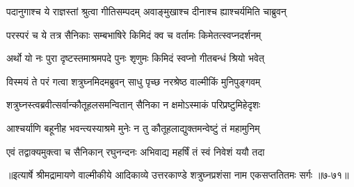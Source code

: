 \twolineshloka
{पदानुगाश्च ये राज्ञस्तां श्रुत्वा गीतिसम्पदम्}
{अवाङ्मुखाश्च दीनाश्च ह्याश्चर्यमिति चाब्रुवन्} %

\twolineshloka
{परस्परं च ये तत्र सैनिकाः सम्बभाषिरे}
{किमिदं क्व च वर्तामः किमेतत्स्वप्नदर्शनम्} %

\twolineshloka
{अर्थो यो नः पुरा दृष्टस्तमाश्रमपदे पुनः}
{शृणुमः किमिदं स्वप्नो गीतबन्धं श्रियो भवेत्} %

\twolineshloka
{विस्मयं ते परं गत्वा शत्रुघ्नमिदमब्रुवन्}
{साधु पृच्छ नरश्रेष्ठ वाल्मीकिं मुनिपुङ्गवम्} %

\twolineshloka
{शत्रुघ्नस्त्वब्रवीत्सर्वान्कौतूहलसमन्वितान्}
{सैनिका न क्षमोऽस्माकं परिप्रष्टुमिहेदृशः} %

\twolineshloka
{आश्चर्याणि बहूनीह भवन्त्यस्याश्रमे मुनेः}
{न तु कौतूहलाद्युक्तमन्वेष्टुं तं महामुनिम्} %

\twolineshloka
{एवं तद्वाक्यमुक्त्वा च सैनिकान् रघुनन्दनः}
{अभिवाद्य महर्षिं तं स्वं निवेशं ययौ तदा} %


॥इत्यार्षे श्रीमद्रामायणे वाल्मीकीये आदिकाव्ये उत्तरकाण्डे शत्रुघ्नप्रशंसा नाम एकसप्ततितमः सर्गः ॥७-७१॥
